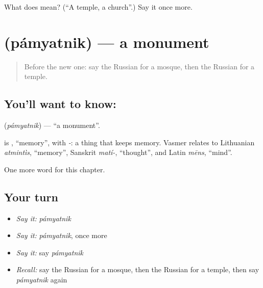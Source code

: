 \begin{tcolorbox}[breakable,colback=teal!4,colframe=teal!35!black,title={Before you move on}]
What does  mean? (\textquotedblleft{}A temple, a church\textquotedblright{}.) Say it once more.
\end{tcolorbox}
\section[\texorpdfstring{\ru{памятник} (pámyatnik)}{памятник (pámyatnik)}]{ (pámyatnik) — a monument}

\label{lesson:RU-C153-pamyatnik}



\begin{quote}
Before the new one: say the Russian for a mosque, then the Russian for a temple.
\end{quote}

\subsection*{You'll want to know: }
\textbf{} (\emph{pámyatnik}) — \textquotedblleft{}a monument\textquotedblright{}.

\begin{cousinweb}
\textbf{} is \emph{}, \textquotedblleft{}memory\textquotedblright{}, with \emph{-}: a thing that keeps memory. Vasmer relates \emph{} to Lithuanian \emph{atmintìs}, \textquotedblleft{}memory\textquotedblright{}, Sanskrit \emph{matí-}, \textquotedblleft{}thought\textquotedblright{}, and Latin \emph{mēns}, \textquotedblleft{}mind\textquotedblright{}.
\end{cousinweb}

\begin{grammarlens}[title={What you've built}]
One more word for this chapter.
\end{grammarlens}

\subsection*{Your turn}
\begin{itemize}
\raggedright
  \item \emph{Say it:} \emph{pámyatnik}
  \item \emph{Say it:} \emph{pámyatnik}, once more
  \item \emph{Say it:} say \emph{pámyatnik}
  \item \emph{Recall:} say the Russian for a mosque, then the Russian for a temple, then say \emph{pámyatnik} again
\end{itemize}

